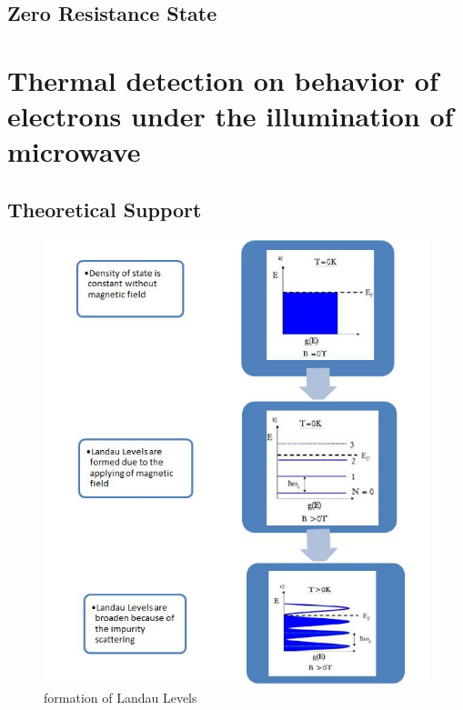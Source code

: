 \documentclass[12pt]{ruthesis}
\begin{document}
\section{Zero Resistance State}\label{ZRS}










\chapter{Thermal detection on behavior of electrons under the illumination of microwave}\label{Thermal}





\section{Theoretical Support}\label{Theoretical}

\begin{figure}
  \centering
  \includegraphics[totalheight=8cm]{figures/llformation.JPG}
  \caption{formation of Landau Levels}
  \label{llformation}
\end{figure}
 
\end{document}
